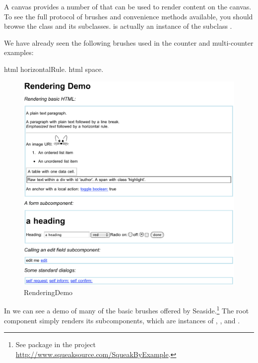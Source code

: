 \documentclass[a4paper,10pt,twoside]{book}
\begin{document}
A canvas provides a number of  that can be used to render content on the canvas.
To see the full protocol of brushes and convenience methods available, you should browse the class  and its subclasses.
 is actually an instance of the subclass .

We have already seen the following brushes used in the counter and multi-counter examples:
\begin{code}{}
html horizontalRule.
html space.
\end{code}

\begin{figure}[ht]
\begin{center}
\includegraphics[width=\textwidth]{RenderingDemo}
\caption{RenderingDemo}
\label{fig:RenderingDemo}
\end{center}
\end{figure}

In  we can see a demo of many of the basic brushes offered by Seaside.\footnote{See package  in the project \url{http://www.squeaksource.com/SqueakByExample}.}
The root component  simply renders its subcomponents, which are instances of , ,  and .
\end{document}
